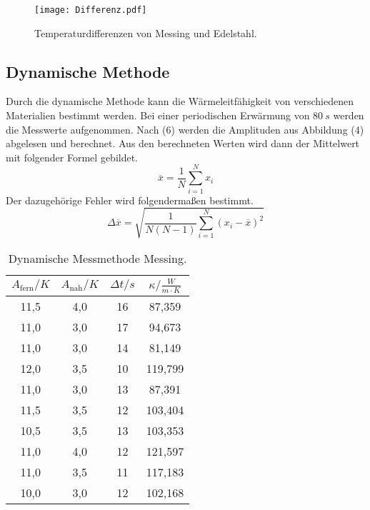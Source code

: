 \begin{figure}[H]
    \centering
    \texttt{[image: Differenz.pdf]}
    \caption{Temperaturdifferenzen von Messing und Edelstahl.}
    \label{fig:c}
\end{figure}

\subsection{Dynamische Methode}
Durch die dynamische Methode kann die Wärmeleitfähigkeit \kappa von verschiedenen Materialien bestimmt werden.
Bei einer periodischen Erwärmung von $\SI{80}{s}$ werden die Messwerte aufgenommen.
Nach (6) werden die Amplituden aus Abbildung (4) abgelesen und \kappa berechnet.
Aus den berechneten Werten wird dann der Mittelwert mit folgender Formel gebildet.
\begin{equation}
    \overline{x} = \frac{1}{N} \sum_{i=1}^N x_i
\end{equation}
Der dazugehörige Fehler wird folgendermaßen bestimmt.
\begin{equation}
    \Delta \overline{x} = \sqrt{\frac{1}{N(N-1)}\sum \limits_{i=1}^N (x_i-\overline{x})^2}
\end{equation}

\begin{table}[H]
    \begin{center}
      \caption{Dynamische Messmethode Messing.}
      \label{tab:c}
      \begin{tabular}{c|c|c|c} 
        \textbf{$A_\text{fern} / K$ } &  \textbf{$A_\text{nah} / K$} & \textbf{$\Delta t / s$} & \textbf{$\kappa / \frac{W}{m \cdot K}$}\\
        \hline
        11,5 &4,0 &16 & 87,359 \\
        11,0 &3,0 &17 & 94,673 \\
        11,0 &3,0 &14 & 81,149 \\
        12,0 &3,5 &10 & 119,799 \\
        11,0 &3,0 &13 & 87,391 \\
        11,5 &3,5 &12 & 103,404 \\
        10,5 &3,5 &13 & 103,353 \\
        11,0 &4,0 &12 & 121,597 \\
        11,0 &3,5 &11 & 117,183 \\
        10,0 &3,0 &12 & 102,168 \\
      \end{tabular}
    \end{center}
\end{table}

